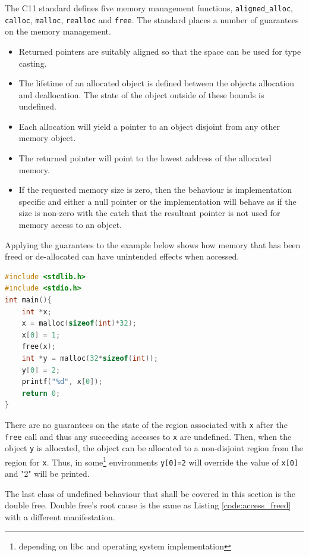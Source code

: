 The C11 standard defines five memory management functions\cite{iso_standard}, \texttt{aligned\_alloc}, \texttt{calloc}, \texttt{malloc}, \texttt{realloc} and \texttt{free}. The standard places a number of guarantees on the memory management.
\begin{itemize}
    \item Returned pointers are suitably aligned so that the space can be used for type casting.
    \item The lifetime of an allocated object is defined between the objects allocation and deallocation. The state of the object outside of these bounds is undefined.
    \item Each allocation will yield a pointer to an object disjoint from any other memory object.
    \item The returned pointer will point to the lowest address of the allocated memory.
    \item If the requested memory size is zero, then the behaviour is implementation specific and either a null pointer or the implementation will behave as if the size is non-zero with the catch that the resultant pointer is not used for memory access to an object.
\end{itemize}

Applying the guarantees to the example below shows how memory that has been freed or de-allocated can have unintended effects when accessed. 

\begin{lstlisting}[language=C, caption=Access previously freed memory, label={code:access_freed}]
#include <stdlib.h>
#include <stdio.h>
int main(){
    int *x;
    x = malloc(sizeof(int)*32);
    x[0] = 1;
    free(x);
    int *y = malloc(32*sizeof(int));
    y[0] = 2;
    printf("%d", x[0]);
    return 0;
}
\end{lstlisting}

There are no guarantees on the state of the region associated with \texttt{x} after the \texttt{free} call and thus any succeeding accesses to \texttt{x} are undefined. Then, when the object \texttt{y} is allocated, the object can be allocated to a non-disjoint region from the region for \texttt{x}. Thus, in some\footnote{depending on libc and operating system implementation} environments \texttt{y[0]=2} will override the value of \texttt{x[0]} and "2" will be printed.

The last class of undefined behaviour that shall be covered in this section is the double free. Double free's root cause is the same as Listing \ref{code:access_freed} with a different manifestation.

